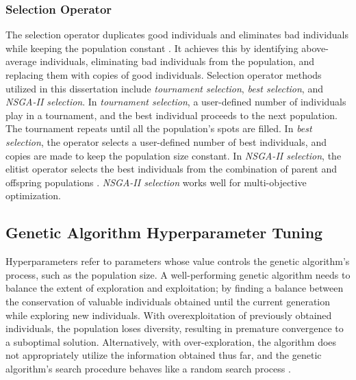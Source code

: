 \subsubsection{Selection Operator}
The selection operator duplicates good individuals and eliminates bad individuals 
while keeping the population constant \cite{deb_multi-objective_2001}. 
It achieves this by identifying above-average individuals, eliminating bad 
individuals from the population, and replacing them with copies of good individuals.
Selection operator methods utilized in this dissertation include \textit{tournament 
selection}, \textit{best selection}, and \textit{\gls{NSGA-II} selection}. 
In \textit{tournament selection}, a user-defined number of individuals play in a
tournament, and the best individual proceeds to the next population. 
The tournament repeats until all the population's spots are filled.
In \textit{best selection}, the operator selects a user-defined number of best 
individuals, and copies are made to keep the population size constant. 
In \textit{NSGA-II selection}, the elitist operator selects the best individuals 
from the combination of parent and offspring populations \cite{deb_fast_2002}.
\textit{NSGA-II selection} works well for multi-objective optimization. 

\subsection{Genetic Algorithm Hyperparameter Tuning}
Hyperparameters refer to parameters whose value controls 
the genetic algorithm's process, such as the population size. 
A well-performing genetic algorithm needs to balance the extent of exploration and 
exploitation; by finding a balance between the conservation of 
valuable individuals obtained until the current generation while exploring new 
individuals. 
With overexploitation of previously obtained individuals, the population loses 
diversity, resulting in premature convergence to a suboptimal solution. 
Alternatively, with over-exploration, the algorithm does not appropriately utilize 
the information obtained thus far, and the genetic algorithm's search procedure 
behaves like a random search process
\cite{deb_multi-objective_2001}. 

